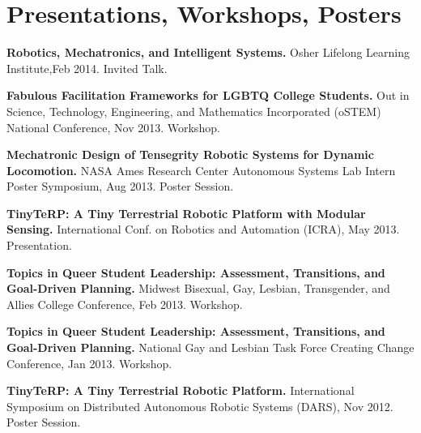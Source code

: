 \documentclass[letterpaper]{deedy-resume} %
\begin{document}
\begin{minipage}[t]{0.60\textwidth}
\begin{tightitemize}
\end{tightitemize}

\sectionspace


\section{Presentations, Workshops, Posters}

\vspace{0.4cm}
\begin{tightitemize}

\item \textbf{Robotics, Mechatronics, and Intelligent Systems.} Osher Lifelong Learning Institute,Feb 2014. Invited Talk.

\item \textbf{Fabulous Facilitation Frameworks for LGBTQ College Students.} Out in Science, Technology, Engineering, and Mathematics Incorporated (oSTEM) National Conference, Nov 2013. Workshop.

\item \textbf{Mechatronic Design of Tensegrity Robotic Systems for Dynamic Locomotion.} NASA Ames Research Center Autonomous Systems Lab Intern Poster Symposium, Aug 2013. Poster Session.

\item \textbf{TinyTeRP: A Tiny Terrestrial Robotic Platform with Modular Sensing.} International Conf. on Robotics and Automation (ICRA), May 2013. Presentation.

\item \textbf{Topics in Queer Student Leadership: Assessment, Transitions, and Goal-Driven Planning.} Midwest Bisexual, Gay, Lesbian, Transgender, and Allies College Conference, Feb 2013. Workshop.

\item \textbf{Topics in Queer Student Leadership: Assessment, Transitions, and Goal-Driven Planning.} National Gay and Lesbian Task Force Creating Change Conference, Jan 2013. Workshop.

\item \textbf{TinyTeRP: A Tiny Terrestrial Robotic Platform.} International Symposium on Distributed Autonomous Robotic Systems (DARS), Nov 2012. Poster Session.

\end{tightitemize}



\end{minipage}%
\end{document}
